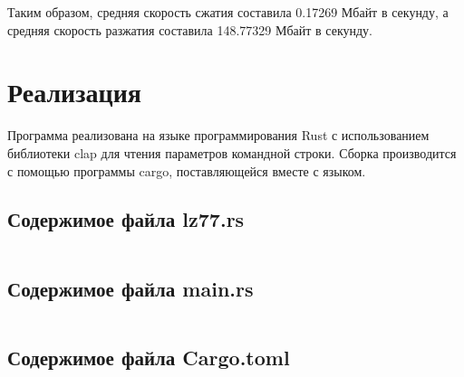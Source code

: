 \documentclass[a4paper,oneside]{article}
\theoremstyle{definition}
\begin{document}
Таким образом, средняя скорость сжатия составила 0.17269 Мбайт в секунду, а
средняя скорость разжатия составила 148.77329 Мбайт в секунду.

\section{Реализация}

Программа реализована на языке программирования Rust с использованием библиотеки
clap для чтения параметров командной строки. Сборка производится с помощью
программы cargo, поставляющейся вместе с языком.

\subsection{Содержимое файла lz77.rs}
\inputminted{rust}{../../lab7/src/lz77.rs}

\subsection{Содержимое файла main.rs}
\inputminted{rust}{../../lab7/src/main.rs}

\subsection{Содержимое файла Cargo.toml}
\inputminted{toml}{../../lab7/Cargo.toml}
\end{document}
